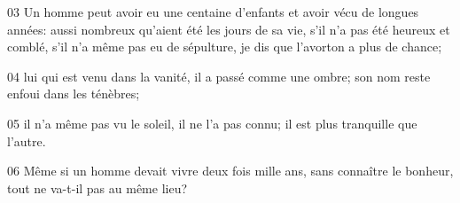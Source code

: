 
03 Un homme peut avoir eu une centaine d’enfants et avoir vécu de longues années: aussi nombreux qu’aient été les jours de sa vie, s’il n’a pas été heureux et comblé, s’il n’a même pas eu de sépulture, je dis que l’avorton a plus de chance;

04 lui qui est venu dans la vanité, il a passé comme une ombre; son nom reste enfoui dans les ténèbres;

05 il n’a même pas vu le soleil, il ne l’a pas connu; il est plus tranquille que l’autre.

06 Même si un homme devait vivre deux fois mille ans, sans connaître le bonheur, tout ne va-t-il pas au même lieu?
